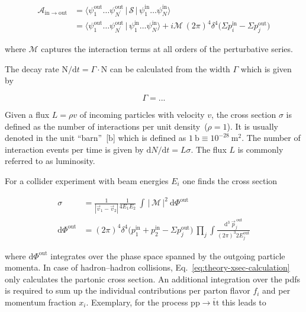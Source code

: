 \begin{align}
\mathcal{A}_\mathrm{in\to out}&=\langle\psi_{1}^\mathrm{out}\ldots\psi_{N^{\prime}}^\mathrm{out}\,|\,\mathcal{S}\,|\,\psi_{1}^\mathrm{in}\ldots\psi_{N}^\mathrm{in}\rangle \\
&=\langle\psi_{1}^\mathrm{out}\ldots\psi_{N^{\prime}}^\mathrm{out}\,|\,\psi_{1}^\mathrm{in}\ldots\psi_{N}^\mathrm{in}\rangle+i\mathcal{M}\,(2\pi)^{4}\delta^{4}\big(\Sigma p^\mathrm{in}_{i}-\Sigma p^\mathrm{out}_{j}\big)
\end{align}

where $\mathcal{M}$ captures the interaction terms at all orders of the perturbative series.

The decay rate $\mathrm{N}/\mathrm{d}t=\Gamma\cdot\mathrm{N}$ can be calculated from the width $\Gamma$ which is given by

\begin{equation}
\Gamma=...
\end{equation}


Given a flux $L=\rho v$ of incoming particles with velocity $v$, the cross section $\sigma$ is defined as the number of interactions per unit density~($\rho=1$). It is usually denoted in the unit ``barn''~[$\mathrm{b}$] which is defined as $1~\mathrm{b}\equiv 10^{-28}~\mathrm{m}^{2}$.  The number of interaction events per time is given by $\mathrm{d}N/\mathrm{d}t=L\sigma$. The flux $L$ is commonly referred to as luminosity.

For a collider experiment with beam energies $E_{i}$ one finds the cross section 

\begin{align}
\sigma&=\frac{1}{|\vec{v}_1-\vec{v}_2|}\frac{1}{4E_{1}E_{2}}~\int\,\big|\,\mathcal{M}\,\big|^{2}~\mathrm{d}\Phi^\mathrm{out} \label{eq:theory-xsec-calculation} \\
\mathrm{d}\Phi^\mathrm{out}&=(2\pi)^{4}\delta^{4}\big(p^\mathrm{in}_{1}+p^\mathrm{in}_{2}-\Sigma p^\mathrm{out}_{j}\big)~\prod_{j}\int\frac{\mathrm{d}^{3}~\vec{p}^\mathrm{~out}_{j}}{(2\pi)^{3}2E_{j}^\mathrm{out}}
\end{align}

where $\mathrm{d}\Phi^\mathrm{out}$ integrates over the phase space spanned by the outgoing particle momenta. In case of hadron--hadron collisions, Eq.~\ref{eq:theory-xsec-calculation} only calculates the partonic cross section. An additional integration over the \glspl{pdf} is required to sum up the individual contributions per parton flavor $f_{i}$ and per momentum fraction $x_{i}$. Exemplary, for the process $\mathrm{pp}\to \bar{\mathrm{t}}\mathrm{t}$ this leads to

